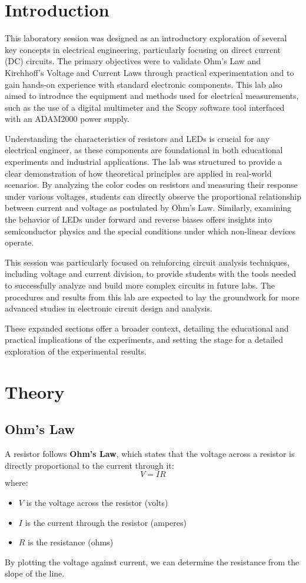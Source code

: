 \documentclass[12pt]{article}
\begin{document}
\section{Introduction}
This laboratory session was designed as an introductory exploration of several
key concepts in electrical engineering, particularly focusing on direct current
(DC) circuits. The primary objectives were to validate Ohm's Law and Kirchhoff's
Voltage and Current Laws through practical experimentation and to gain hands-on
experience with standard electronic components. This lab also aimed to introduce
the equipment and methods used for electrical measurements, such as the use of a
digital multimeter and the Scopy software tool interfaced with an ADAM2000 power
supply.

Understanding the characteristics of resistors and LEDs is crucial for any
electrical engineer, as these components are foundational in both educational
experiments and industrial applications. The lab was structured to provide a
clear demonstration of how theoretical principles are applied in real-world
scenarios. By analyzing the color codes on resistors and measuring their
response under various voltages, students can directly observe the proportional
relationship between current and voltage as postulated by Ohm’s Law. Similarly,
examining the behavior of LEDs under forward and reverse biases offers insights
into semiconductor physics and the special conditions under which non-linear
devices operate.

This session was particularly focused on reinforcing circuit analysis
techniques, including voltage and current division, to provide students with the
tools needed to successfully analyze and build more complex circuits in future
labs. The procedures and results from this lab are expected to lay the
groundwork for more advanced studies in electronic circuit design and analysis.

These expanded sections offer a broader context, detailing the educational and
practical implications of the experiments, and setting the stage for a detailed
exploration of the experimental results.
\section{Theory}

\subsection{Ohm’s Law}
A resistor follows \textbf{Ohm’s Law}, which states that the voltage across a resistor is directly proportional to the current through it:
\[ V = IR \]
where:
\begin{itemize}
	\item \( V \) is the voltage across the resistor (volts)
	\item \( I \) is the current through the resistor (amperes)
	\item \( R \) is the resistance (ohms)
\end{itemize}
By plotting the voltage against current, we can determine the resistance from the slope of the line.
\end{document}
